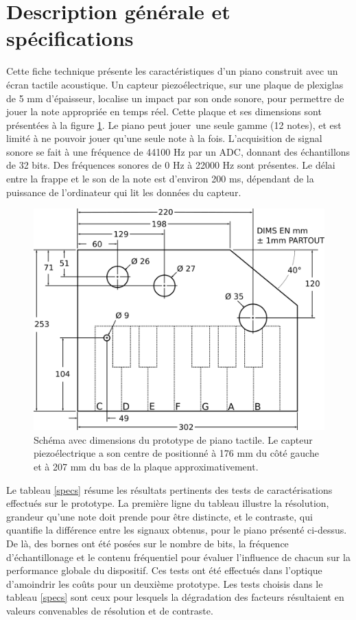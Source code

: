 \documentclass[11pt,letterpaper]{article}
\begin{document}

\section{Description générale et spécifications}

Cette fiche technique présente les caractéristiques d'un piano construit avec un
écran tactile acoustique. Un capteur piezoélectrique, sur une plaque de plexiglas 
de 5 mm d'épaisseur, localise un impact par son onde sonore, pour permettre 
de jouer la note appropriée en temps réel. Cette plaque 
et ses dimensions sont présentées à la figure \ref{piano_fig}. Le piano peut jouer\
une seule gamme (12 notes), et est limité à ne pouvoir jouer qu'une seule note à 
la fois. L'acquisition de signal sonore se fait à une fréquence de 44100 Hz par un
ADC, donnant des échantillons de 32 bits. Des fréquences sonores de 0 Hz à 22000 Hz sont présentes. Le délai entre la frappe
et le son de la note est d'environ 200 ms,
dépendant de la puissance de l'ordinateur qui lit les données du capteur. 
 \begin{figure}[H]
   \centering
   \includegraphics[scale=0.25]{schema.png}
   \caption{Schéma avec dimensions du prototype de piano tactile. Le capteur
   piezoélectrique a son centre de positionné à 176 mm du côté gauche et à 207 mm
   du bas de la plaque approximativement.}
   \label{piano_fig}
 \end{figure}

Le tableau \ref{specs} résume les résultats pertinents des tests de caractérisations
effectués sur le prototype. La première ligne du tableau illustre la résolution, grandeur qu'une note doit prende pour être distincte, et le 
contraste, qui quantifie la différence entre les signaux obtenus, pour le piano présenté ci-dessus. De là, des bornes ont été posées sur le nombre de bits, la fréquence d'échantillonage et le contenu fréquentiel
pour évaluer l'influence de chacun sur la performance globale du dispositif. Ces tests ont été effectués dans l'optique d'amoindrir
les coûts pour un deuxième prototype. Les tests choisis dans le tableau \ref{specs} sont ceux pour lesquels la dégradation 
des facteurs résultaient en valeurs convenables de résolution et de contraste.
\end{document}
